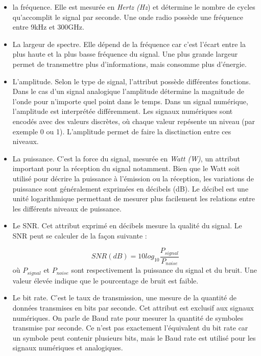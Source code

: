 \vspace{0.1cm}

\begin{itemize}



\item la fréquence. Elle est mesurée en \textit{Hertz (Hz}) et détermine le nombre de cycles qu'accomplit le signal par seconde. Une onde radio possède une fréquence entre 9kHz et 300GHz.

\item La largeur de spectre. Elle dépend de la fréquence car c'est l'écart entre la plus haute et la plus basse fréquence du signal. Une plus grande largeur permet de transmettre plus d'informations, mais consomme plus d'énergie.

\item L'amplitude. Selon le type de signal, l'attribut possède différentes fonctions. Dans le cas d'un signal analogique l'amplitude détermine la magnitude de l'onde pour n'importe quel point dans le temps. Dans un signal numérique, l'amplitude est interprétée différemment. Les signaux numériques sont encodés avec des valeurs discrètes, où chaque valeur repésente un niveau (par exemple 0 ou 1). L'amplitude permet de faire la disctinction entre ces niveaux.

\item La puissance. C'est la force du signal, mesurée en \textit{Watt (W)}, un attribut important pour la réception du signal notamment. Bien que le Watt soit utilisé pour décrire la puissance à l'émission ou la réception, les variations de puissance sont généralement exprimées en décibels (dB). Le décibel est une unité logarithmique permettant de mesurer plus facilement les relations entre les différents niveaux de puissance.

\item Le \ac{SNR}. Cet attribut exprimé en décibels mesure la qualité du signal. Le SNR peut se calculer de la façon suivante : 

\begin{equation}\label{eq0}
SNR(dB) = 10log_{10} \frac{P_{signal}}{P_{noise}}
\end{equation}
où $P_{signal}$ et $P_{noise}$ sont respectivement la puissance du signal et du bruit. Une valeur élevée indique que le pourcentage de bruit est faible. 


\item Le bit rate. C'est le taux de transmission, une mesure de la quantité de données transmises en bits par seconde. Cet attribut est exclusif aux signaux numériques. On parle de Baud rate pour mesurer la quantité de symboles transmise par seconde. Ce n'est pas exactement l'équivalent du bit rate car un symbole peut contenir plusieurs bits, mais le Baud rate est utilisé pour les signaux numériques et analogiques.

\end{itemize}


